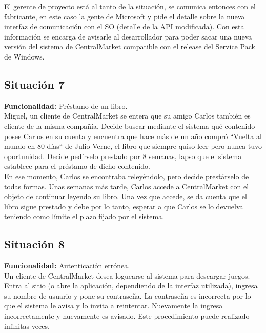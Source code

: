 \documentclass[11pt, a4paper, spanish]{article}
\begin{document}
       El gerente de proyecto est\'a al tanto de la situaci\'on, se comunica entonces con el fabricante, en este caso la gente de Microsoft y pide el    
   detalle sobre la nueva interfaz de comunicaci\'on con el SO (detalle de la API modificada). Con esta informaci\'on se encarga de avisarle al 
   desarrollador para poder sacar una nueva versi\'on del sistema de CentralMarket compatible con el release del Service Pack de Windows.

\subsection{Situaci\'on 7}

	\textbf{Funcionalidad:} Pr\'estamo de un libro.\\

	Miguel, un cliente de CentralMarket se entera que su amigo Carlos tambi\'en es cliente de la misma compa\~{n}\'ia. Decide buscar mediante el sistema    
   qu\'e contenido posee Carlos en su cuenta y encuentra que hace m\'as de un a\~{n}o compr\'o ``Vuelta al mundo en 80 d\'ias`` de Julio Verne, el libro que siempre quiso leer pero nunca tuvo oportunidad. Decide ped\'irselo prestado por 8 semanas, lapso que el sistema establece para el pr\'estamo de dicho contenido. \\

        En ese momento, Carlos se encontraba reley\'endolo, pero decide prest\'arselo de todas formas. Unas semanas m\'as tarde, Carlos accede a  CentralMarket con el objeto de continuar leyendo su libro. Una vez que accede, se da cuenta que el libro sigue prestado y debe por lo tanto, esperar a que Carlos se lo devuelva teniendo como l\'imite el plazo fijado por el sistema. 

\subsection{Situaci\'on 8}

	\textbf{Funcionalidad:} Autenticaci\'on err\'onea.\\

	Un cliente de CentralMarket desea loguearse al sistema para descargar juegos. Entra al sitio (o abre la aplicaci\'on, dependiendo de la interfaz 
   utilizada), ingresa su nombre de usuario y pone su contrase\~{n}a. La contrase\~{n}a es incorrecta por lo que el sistema le avisa y lo invita a reintentar. 
   Nuevamente la ingresa incorrectamente y nuevamente es avisado.
   Este procedimiento puede realizado infinitas veces.
\end{document}
